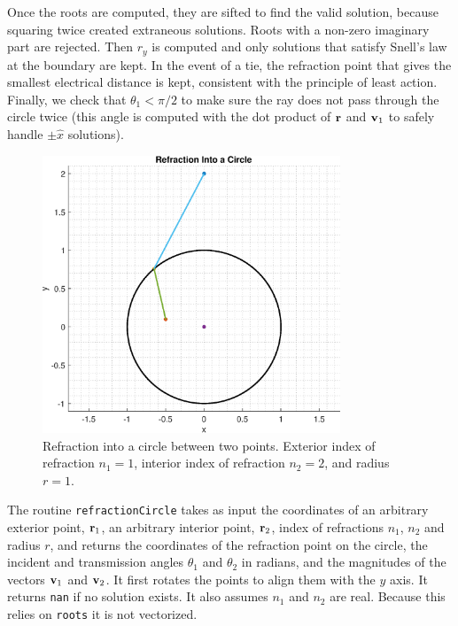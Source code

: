 
Once the roots are computed, they are sifted to find the valid solution, because squaring twice created extraneous solutions. Roots with a non-zero imaginary part are rejected. Then $r_y$ is computed and only solutions that satisfy Snell's law at the boundary are kept. In the event of a tie, the refraction point that gives the smallest electrical distance is kept, consistent with the principle of least action. Finally, we check that $\theta_1 < \pi/2$ to make sure the ray does not pass through the circle twice (this angle is computed with the dot product of $\mathbf{r}$ and $\mathbf{v}_1$ to safely handle $\pm \hat{x}$ solutions). 


\begin{figure}[h] 
   \centering
   \includegraphics[width=3.5in]{ReflectionRefraction/Figures/refractionrayscircle} 
   \caption{Refraction into a circle between two points. Exterior index of refraction $n_1 = 1$, interior index of refraction $n_2 = 2$, and radius $r = 1$. }
\end{figure}


The routine \texttt{refractionCircle} takes as input the coordinates of an arbitrary exterior point, $\mathbf{r}_1$, an arbitrary interior point, $\mathbf{r}_2$, index of refractions $n_1$, $n_2$ and radius $r$, and returns the coordinates of the refraction point on the circle, the incident and transmission angles $\theta_1$ and $\theta_2$ in radians, and the magnitudes of the vectors $\mathbf{v}_1$ and $\mathbf{v}_2$. It first rotates the points to align them with the $y$ axis. It returns \texttt{nan} if no solution exists. It also assumes $n_1$ and $n_2$ are real.  Because this relies on \texttt{roots} it is not vectorized. 

